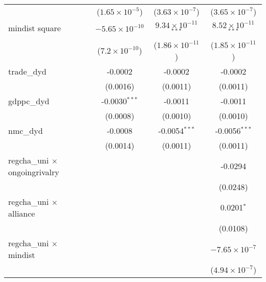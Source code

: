 \begin{tabular}{lcccc}
                                         &                & ($1.65\times 10^{-5}$)  & ($3.63\times 10^{-7}$)         & ($3.65\times 10^{-7}$)\\    
   mindist square                        &                & $-5.65\times 10^{-10}$  & $9.34\times 10^{-11}$$^{***}$  & $8.52\times 10^{-11}$$^{***}$\\    
                                         &                & ($7.2\times 10^{-10}$)  & ($1.86\times 10^{-11}$)        & ($1.85\times 10^{-11}$)\\    
   trade\_dyd                            &                & -0.0002                 & -0.0002                        & -0.0002\\   
                                         &                & (0.0016)                & (0.0011)                       & (0.0011)\\   
   gdppc\_dyd                            &                & -0.0030$^{***}$         & -0.0011                        & -0.0011\\   
                                         &                & (0.0008)                & (0.0010)                       & (0.0010)\\   
   nmc\_dyd                              &                & -0.0008                 & -0.0054$^{***}$                & -0.0056$^{***}$\\   
                                         &                & (0.0014)                & (0.0011)                       & (0.0011)\\   
   regcha\_uni $\times$ ongoingrivalry   &                &                         &                                & -0.0294\\   
                                         &                &                         &                                & (0.0248)\\   
   regcha\_uni $\times$ alliance         &                &                         &                                & 0.0201$^{*}$\\   
                                         &                &                         &                                & (0.0108)\\   
   regcha\_uni $\times$ mindist          &                &                         &                                & $-7.65\times 10^{-7}$\\    
                                         &                &                         &                                & ($4.94\times 10^{-7}$)\\    

\end{tabular}
